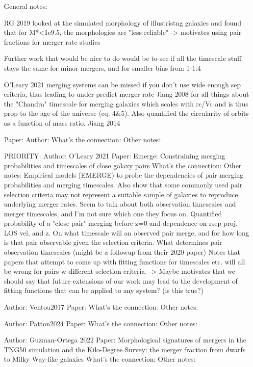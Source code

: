 General notes:

RG 2019 looked at the simulated morphology of illustristng galaxies and found that for M*<1e9.5, the morphologies are "less reliable" -> motivates using pair fractions for merger rate studies 

Further work that would be nice to do would be to see if all the timescale stuff stays the same for minor mergers, and for smaller bins from 1-1:4

O'Leary 2021 merging systems can be missed if you don't use wide enough sep criteria, thus leading to under predict merger rate
Jiang 2008 for all things about the "Chandra" timescale for merging galaxies which scales with rc/Vc and is thus prop to the age of the universe (eq. 4\&5). Also quantified the circularity of orbits as a function of mass ratio.
Jiang 2014 


Paper:
Author:
What's the connection:
Other notes:

PRIORITY: 
    Author: O'Leary 2021
    Paper: Emerge: Constraining merging probabilities and timescales of close galaxy pairs 
    What's the connection:
    Other notes: 
    Empirical models (EMERGE) to probe the dependencies of pair merging probabilities and merging timescales. Also show that some commonly used pair selection criteria may not represent a suitable sample of galaxies to reproduce underlying merger rates. Seem to talk about both observation timescales and merger timescales, and I'm not sure which one they focus on.
    Quantified probability of a "close pair" merging before z=0 and dependence on rsep-proj, LOS vel, and z. 
    On what timescale will an observed pair merge, and for how long is that pair observable given the selection criteria. 
    What determines pair observation timescales (might be a followup from their 2020 paper) 
    Notes that papers that attempt to come up with fitting functions for timescales etc. will all be wrong for pairs w different selection criteria.
    -> Maybe motivates that we should say that future extensions of our work may lead to the development of fitting functions that can be applied to any system? (is this true?)
    

    
    Author: Ventou2017
    Paper: 
    What's the connection: 
    Other notes: 
    
    Author: Patton2024
    Paper: 
    What's the connection:
    Other notes:
    

    Author: Guzman-Ortega 2022
    Paper: Morphological signatures of mergers in the TNG50 simulation and the Kilo-Degree Survey: the merger fraction from dwarfs to Milky Way-like galaxies
    What's the connection:
    Other notes:


